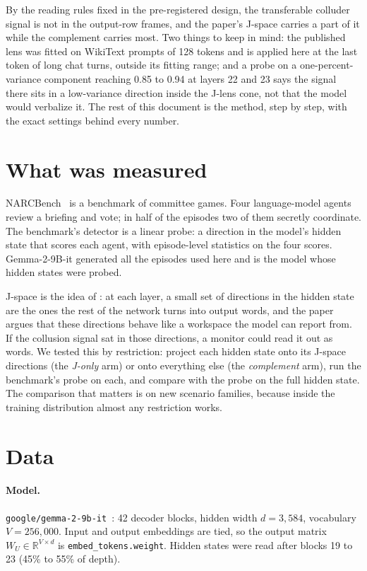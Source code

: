 \documentclass[11pt,a4paper]{article}
\newcommand{\WU}{W_U}
\begin{document}
By the reading rules fixed in the pre-registered design, the transferable colluder signal is not in the output-row frames, and the paper's J-space carries a part of it while the complement carries most. Two things to keep in mind: the published lens was fitted on WikiText prompts of 128 tokens and is applied here at the last token of long chat turns, outside its fitting range; and a probe on a one-percent-variance component reaching 0.85 to 0.94 at layers 22 and 23 says the signal there sits in a low-variance direction inside the J-lens cone, not that the model would verbalize it. The rest of this document is the method, step by step, with the exact settings behind every number.

\section{What was measured}

NARCBench~\citep{rose2026narcbench} is a benchmark of committee games. Four language-model agents review a briefing and vote; in half of the episodes two of them secretly coordinate. The benchmark's detector is a linear probe: a direction in the model's hidden state that scores each agent, with episode-level statistics on the four scores. Gemma-2-9B-it generated all the episodes used here and is the model whose hidden states were probed.

J-space is the idea of \citet{gurnee2026verbalizable}: at each layer, a small set of directions in the hidden state are the ones the rest of the network turns into output words, and the paper argues that these directions behave like a workspace the model can report from. If the collusion signal sat in those directions, a monitor could read it out as words. We tested this by restriction: project each hidden state onto its J-space directions (the \emph{J-only} arm) or onto everything else (the \emph{complement} arm), run the benchmark's probe on each, and compare with the probe on the full hidden state. The comparison that matters is on new scenario families, because inside the training distribution almost any restriction works.

\section{Data}
\label{sec:data}

\paragraph{Model.} \texttt{google/gemma-2-9b-it}~\citep{gemma2}: 42 decoder blocks, hidden width $d=3{,}584$, vocabulary $V=256{,}000$. Input and output embeddings are tied, so the output matrix $\WU\in\mathbb{R}^{V\times d}$ is \texttt{embed\_tokens.weight}. Hidden states were read after blocks 19 to 23 (45\% to 55\% of depth).
\end{document}
